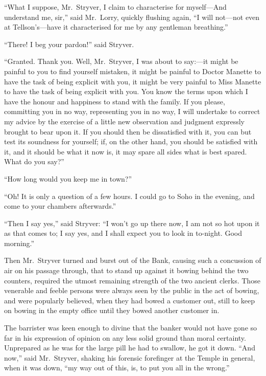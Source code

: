 ``What I suppose, Mr.\ Stryver, I claim to characterise for myself---And
understand me, sir,'' said Mr.\ Lorry, quickly flushing again,
``I will not---not even at Tellson's---have it characterised for me by any
gentleman breathing.''

``There!  I beg your pardon!'' said Stryver.

``Granted.  Thank you.  Well, Mr.\ Stryver, I was about to say:---it
might be painful to you to find yourself mistaken, it might be painful
to Doctor Manette to have the task of being explicit with you, it
might be very painful to Miss Manette to have the task of being
explicit with you.  You know the terms upon which I have the honour
and happiness to stand with the family.  If you please, committing you
in no way, representing you in no way, I will undertake to correct my
advice by the exercise of a little new observation and judgment expressly
brought to bear upon it.  If you should then be dissatisfied with it,
you can but test its soundness for yourself; if, on the other hand,
you should be satisfied with it, and it should be what it now is,
it may spare all sides what is best spared.  What do you say?''

``How long would you keep me in town?''

``Oh!  It is only a question of a few hours.  I could go to Soho in the
evening, and come to your chambers afterwards.''

``Then I say yes,'' said Stryver:  ``I won't go up there now, I am not
so hot upon it as that comes to; I say yes, and I shall expect you
to look in to-night.  Good morning.''

Then Mr.\ Stryver turned and burst out of the Bank, causing such a
concussion of air on his passage through, that to stand up against it
bowing behind the two counters, required the utmost remaining strength
of the two ancient clerks.  Those venerable and feeble persons were
always seen by the public in the act of bowing, and were popularly
believed, when they had bowed a customer out, still to keep on bowing
in the empty office until they bowed another customer in.

The barrister was keen enough to divine that the banker would not
have gone so far in his expression of opinion on any less solid
ground than moral certainty.  Unprepared as he was for the large pill
he had to swallow, he got it down.  ``And now,'' said Mr.\ Stryver,
shaking his forensic forefinger at the Temple in general, when it
was down, ``my way out of this, is, to put you all in the wrong.''

